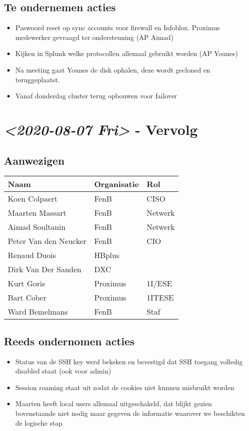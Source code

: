 \documentclass[11pt]{article}
\begin{document}
\subsection{Te ondernemen acties}
\label{sec:org21eff0b}
\begin{itemize}
\item Paswoord reset op sync accounts voor firewall en Infoblox. Proximus medewerker gevraagd ter ondersteuning (AP Aimad)
\item Kijken in Splunk welke protocollen allemaal gebruikt worden (AP Younes)
\item Na meeting gaat Younes de disk ophalen, deze wordt gecloned en teruggeplaatst.
\item Vanaf donderdag cluster terug opbouwen voor failover
\end{itemize}


\section{\textit{<2020-08-07 Fri> } - Vervolg}
\label{sec:org48df6f5}

\subsection{Aanwezigen}
\label{sec:org1efca89}

\begin{center}
\begin{tabular}{lll}
Naam & Organisatie & Rol\\
\hline
Koen Colpaert & FenB & CISO\\
Maarten Massart & FenB & Netwerk\\
Aimad Soultanin & FenB & Netwerk\\
Peter Van den Neucker & FenB & CIO\\
Renaud Duois & HBplus & \\
Dirk Van Der Sanden & DXC & \\
Kurt Goris & Proximus & 1I/ESE\\
Bart Cober & Proximus & 1ITESE\\
Ward Bemelmans & FenB & Staf\\
\end{tabular}
\end{center}

\subsection{Reeds ondernomen acties}
\label{sec:org946b1ca}
\begin{itemize}
\item Status van de SSH key werd bekeken en bevestigd dat SSH toegang volledig disabled staat (ook voor admin)
\item Session roaming staat uit zodat de cookies niet kunnen misbruikt worden
\item Maarten heeft local users allemaal uitgeschakeld, dat blijkt gezien bovenstaande niet nodig maar gegeven de informatie waarover we beschikten de logische stap
\end{itemize}
\end{document}
